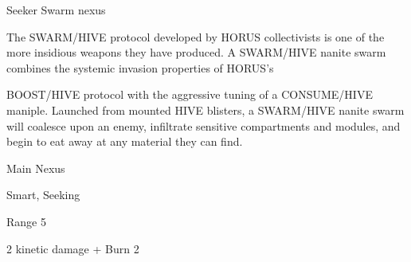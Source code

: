 Seeker Swarm nexus

The SWARM/HIVE protocol developed by HORUS collectivists is one of the more insidious weapons they
have produced. A SWARM/HIVE nanite swarm combines the systemic invasion properties of HORUS’s

BOOST/HIVE protocol with the aggressive tuning of a CONSUME/HIVE maniple. Launched from mounted
HIVE blisters, a SWARM/HIVE nanite swarm will coalesce upon an enemy, infiltrate sensitive compartments
and modules, and begin to eat away at any material they can find.

Main Nexus

Smart, Seeking





Range 5

2 kinetic damage + Burn 2
